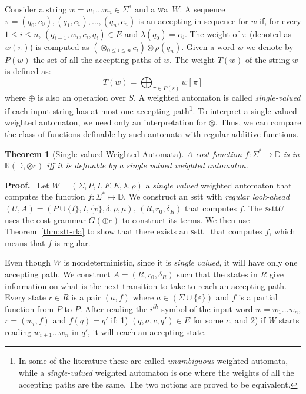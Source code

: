 \documentclass[11pt]{article}
\newtheorem{theorem}{Theorem}
\def\Proof{{\bf Proof.}}
\newcommand{\st}{\ensuremath{^*}}
\newcommand{\domain}{\ensuremath{\mathbb{D}}}
\newcommand{\CG}{G}
\newcommand{\reg}[1]{{\mathbb R}(#1)}
\newcommand{\SSTT}{{\sc\textsc sstt}\xspace}
\newcommand{\stt}{\ensuremath{U}}
\newcommand{\inputalph}{\ensuremath{\Sigma}}
\newcommand{\fm}[1]{\ensuremath{#1^{*}}}
\newcommand{\WA}{{\sc\textsc wa}\xspace}
\newcommand{\srplus}{\ensuremath{\oplus}}
\newcommand{\wa}{\ensuremath{W}}
\newcommand{\wastates}{\ensuremath{P}}
\newcommand{\wainitst}{\ensuremath{I}}
\newcommand{\wafinalst}{\ensuremath{F}}
\newcommand{\watrans}{\ensuremath{E}}
\newcommand{\wainit}{\ensuremath{\lambda}}
\newcommand{\wafinal}{\ensuremath{\rho}}
\newcommand{\wapath}{\ensuremath{\pi}}
\newcommand{\thmref}[1]{Theorem~\ref{thm:#1}\xspace}
\newcommand{\setof}[1]{\{#1\}}
\def\myplus{\otimes}
\def\mytimes{\oplus}
\begin{document}
Consider a string $w=w_1\ldots w_n \in\Sigma\st$ and a \WA~\wa.  A
sequence $\pi=(q_0,c_0),(q_1,c_1),\ldots, (q_n,c_n)$ is an accepting
in sequence for $w$ if, for every $1\leq i\leq n$,
$(q_{i-1},w_i,c_i,q_i)\in\watrans$ and $\wainit(q_0)=c_0$.  The weight
of $\pi$ (denoted as $w(\pi)$) is computed as $(\myplus_{0\leq i\leq
n}c_i) \myplus\wafinal(q_n)$.  Given a word $w$ we denote by $P(w)$
the set of all the accepting paths of $w$.  The weight $T(w)$ of the
string $w$ is defined as: $$T(w)=\bigoplus_{\wapath\in P(s)} w[\pi]$$
where $\srplus$ is also an operation over $S$.  A weighted automaton
is called {\em single-valued} if each input string has at most one
accepting path\footnote{In some of the literature these are called
\emph{unambiguous} weighted automata, while a \emph{single-valued}
weighted automaton is one where the weights of all the accepting paths
are the same. The two notions are proved to be equivalent.}.  To
interpret a single-valued weighted automaton, we need only an
interpretation for $\myplus$. Thus, we can compare the class of
functions definable by such automata with regular additive functions.

\begin{theorem}[Single-valued Weighted Automata]\label{exprplus}
A cost function $f:\fm\Sigma\mapsto\domain$ is in $\reg{\domain,\myplus c}$
iff it is definable by a single valued weighted automaton.
\end{theorem}
\Proof~ Let $\wa=(\inputalph, \wastates, \wainitst, \wafinalst,\watrans,
\wainit, \wafinal)$ a \emph{single valued} weighted automaton that
computes the function $f:\fm\Sigma\mapsto\domain$.  We construct an
\SSTT with \emph{regular look-ahead}
$(\stt,A)=(\wastates\cup\{\wainitst\},\wainitst,\{v\},\delta,\rho,\mu)$,
$(R,r_0,\delta_R)$ that computes $f$. The \SSTT $\stt$ uses the cost
grammar $\CG(\mytimes c)$ to construct its terms.  We then use
\thmref{stt-rla} to show that there exists an \SSTT~ that computes
$f$, which means that $f$ is regular.

Even though $\wa$ is nondeterministic, since it is \emph{single
valued}, it will have only one accepting path.  We construct
$A=(R,r_0,\delta_R)$ such that the states in $R$ give information on
what is the next transition to take to reach an accepting path.  Every
state $r\in R$ is a pair $(a,f)$ where
$a\in(\Sigma\cup\setof{\varepsilon})$ and $f$ is a partial function
from $\wastates$ to $\wastates$. After reading the $i^{th}$ symbol of
the input word $w=w_1\ldots w_n$, $r=(w_i,f)$ and $f(q)=q'$ if:
1) $(q,a,c,q')\in \watrans$ for some $c$, and
2) if $\wa$ starts reading $w_{i+1}\ldots w_n$ in $q'$, it will reach an accepting state.
\end{document}
